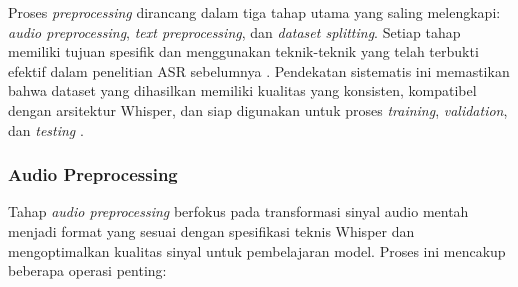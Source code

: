 Proses \textit{preprocessing} dirancang dalam tiga tahap utama yang saling melengkapi: \textit{audio preprocessing}, \textit{text preprocessing}, dan \textit{dataset splitting}. Setiap tahap memiliki tujuan spesifik dan menggunakan teknik-teknik yang telah terbukti efektif dalam penelitian ASR sebelumnya \cite{juang2005history}. Pendekatan sistematis ini memastikan bahwa dataset yang dihasilkan memiliki kualitas yang konsisten, kompatibel dengan arsitektur Whisper, dan siap digunakan untuk proses \textit{training}, \textit{validation}, dan \textit{testing} \cite{kohavi1995crossvalidation}.

\subsubsection{Audio Preprocessing}

Tahap \textit{audio preprocessing} berfokus pada transformasi sinyal audio mentah menjadi format yang sesuai dengan spesifikasi teknis Whisper dan mengoptimalkan kualitas sinyal untuk pembelajaran model. Proses ini mencakup beberapa operasi penting:

